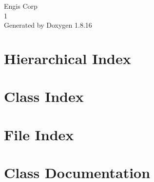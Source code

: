 \let\mypdfximage\pdfximage\def\pdfximage{\immediate\mypdfximage}\documentclass[twoside]{book}
\newcommand{\+}{\discretionary{\mbox{\scriptsize$\hookleftarrow$}}{}{}}
\newcommand{\clearemptydoublepage}{%
  \newpage{\pagestyle{empty}\cleardoublepage}%
}
\begin{document}
\hypersetup{pageanchor=false,
             bookmarksnumbered=true,
             pdfencoding=unicode
            }
\begin{titlepage}
\vspace*{7cm}
\begin{center}%
{\Large Engi\textquotesingle{}s Corp \\[1ex]\large 1 }\\
\vspace*{1cm}
{\large Generated by Doxygen 1.8.16}\\
\end{center}
\end{titlepage}
\clearemptydoublepage
{}
\tableofcontents
\clearemptydoublepage
{}
\hypersetup{pageanchor=true}

\chapter{Hierarchical Index}

\chapter{Class Index}

\chapter{File Index}

\chapter{Class Documentation}














































\end{document}
